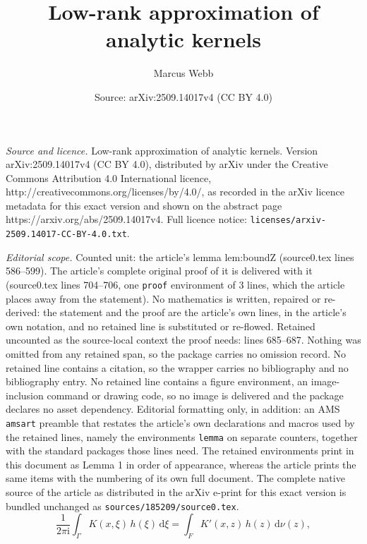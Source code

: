 \documentclass[10pt,a4paper]{amsart}
\title{Low-rank approximation of analytic kernels}
\author{Marcus Webb}
\date{Source: arXiv:2509.14017v4 (CC BY 4.0)}
\begin{document}
\maketitle

\noindent\emph{Source and licence.} Low-rank approximation of analytic kernels. Version arXiv:2509.14017v4 (CC BY 4.0), distributed by arXiv under the Creative Commons Attribution 4.0 International licence, http://creativecommons.org/licenses/by/4.0/, as recorded in the arXiv licence metadata for this exact version and shown on the abstract page https://arxiv.org/abs/2509.14017v4. Full licence notice: \texttt{licenses/arxiv-2509.14017-CC-BY-4.0.txt}.\par\smallskip

\noindent\textit{Editorial scope.} Counted unit: the article's lemma lem:boundZ (source0.tex lines 586--599). The article's complete original proof of it is delivered with it (source0.tex lines 704--706, one \texttt{proof} environment of 3 lines, which the article places away from the statement). No mathematics is written, repaired or re-derived: the statement and the proof are the article's own lines, in the article's own notation, and no retained line is substituted or re-flowed.  Retained uncounted as the source-local context the proof needs: lines 685--687.  Nothing was omitted from any retained span, so the package carries no omission record.  No retained line contains a citation, so the wrapper carries no bibliography and no bibliography entry.  No retained line contains a figure environment, an image-inclusion command or drawing code, so no image is delivered and the package declares no asset dependency.  Editorial formatting only, in addition: an AMS \texttt{amsart} preamble that restates the article's own declarations and macros used by the retained lines, namely the environments \texttt{lemma} on separate counters, together with the standard packages those lines need.  The retained environments print in this document as Lemma 1 in order of appearance, whereas the article prints the same items with the numbering of its own full document.  The complete native source of the article as distributed in the arXiv e-print for this exact version is bundled unchanged as \texttt{sources/185209/source0.tex}.
\begin{equation}\label{eqn:KandK'}
    \frac{1}{2\pi \mathrm{i}}\int_\Gamma K(x,\xi) \, h(\xi) \, \mathrm{d}\xi = \int_F K'(x,z) \, h(z) \, \mathrm{d}\nu(z),
\end{equation}
\end{document}
